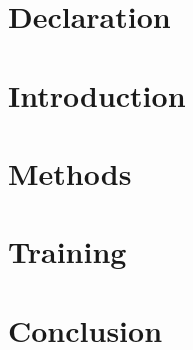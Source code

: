 \documentclass[a4paper,12pt,headsepline, fleqn, english]{scrartcl}%
\begin{document}
	
	
	
	\newpage
	
	\section{Declaration}
	
	\newpage
	
	\setcounter{page}{1}
	
	\thispagestyle{empty}
	\tableofcontents
	
	\newpage
	
	
	\section{Introduction}

	
	

	\section{Methods}
	
	

	\section{Training}
	
	
	
	
	\section{Conclusion}
	
	\newpage	
	
	\printbibliography
\end{document}
